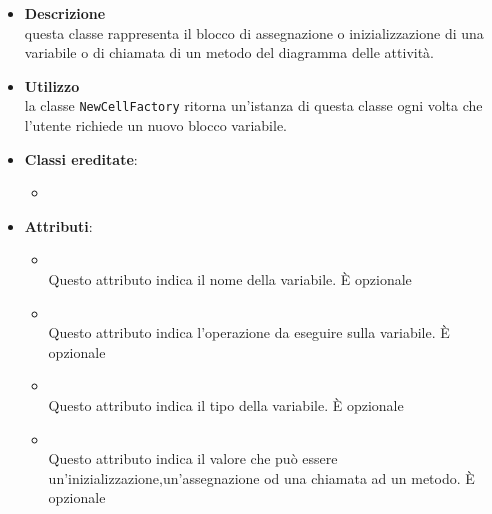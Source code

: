\label{\nogloxy{swedesigner::client::model::celltypes::activity::HxVariable}}
\begin{figure}[h]
\centering
{}
\caption{}
\end{figure}
\FloatBarrier
\begin{itemize}
\item \textbf{Descrizione}\\
questa classe rappresenta il blocco di assegnazione o inizializzazione di una variabile o di chiamata di un metodo del diagramma delle attività.
\item \textbf{Utilizzo}\\
la classe \texttt{NewCellFactory} ritorna un'istanza di questa classe ogni volta che l'utente richiede un nuovo blocco variabile.
\item \textbf{Classi ereditate}:
\begin{itemize}
\item \hyperref[\nogloxy{swedesigner::client::model::celltypes::activity::ActivityDiagramElement}]{}
\end{itemize}
\item \textbf{Attributi}:
\begin{itemize}
\item {}
\\ Questo attributo indica il nome della variabile. È opzionale
\item {}
\\ Questo attributo indica l'operazione da eseguire sulla variabile. È opzionale
\item {}
\\ Questo attributo indica il tipo della variabile. È opzionale
\item {}
\\ Questo attributo indica il valore che può essere un'inizializzazione,un'assegnazione od una chiamata ad un metodo. È opzionale
\end{itemize}
\end{itemize}

